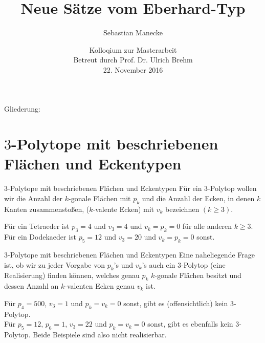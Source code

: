 \documentclass[10pt, notheorems]{beamer}
\begin{document}
\title{Neue Sätze vom {\sc Eberhard}-Typ}
\author{Sebastian Manecke}
\date{Kolloqium zur Masterarbeit\\Betreut durch Prof. Dr. Ulrich Brehm\\22. November 2016}



\frame{\titlepage}



\begin{frame}
  Gliederung:
\tableofcontents
\end{frame}
\section{$3$-Polytope mit beschriebenen Flächen und Eckentypen}
\begin{frame}{$3$-Polytope mit beschriebenen Flächen und Eckentypen}
  Für ein $3$-Polytop wollen wir die Anzahl der $k$-gonale Flächen mit $p_k$ und die Anzahl der Ecken, in denen $k$ Kanten zusammenstoßen, ($k$-valente Ecken) mit $v_k$ bezeichnen $(k \geq 3)$.
  \pause
  \begin{example}
    Für ein Tetraeder ist $p_3 = 4$ und $v_3 = 4$ und $v_k = p_k = 0$ für alle anderen $k \geq 3$.\\
    \pause
    Für ein Dodekaeder ist $p_5 = 12$ und $v_3 = 20$ und $v_k = p_k = 0$ sonst.\\
  \end{example}
\end{frame}
\begin{frame}{$3$-Polytope mit beschriebenen Flächen und Eckentypen}
  Eine naheliegende Frage ist, ob wir zu jeder Vorgabe von $p_k$'s und $v_k$'s auch ein $3$-Polytop (eine Realisierung) finden können, welches genau $p_k$ $k$-gonale Flächen besitzt und dessen Anzahl an $k$-valenten Ecken genau $v_k$ ist.
  \pause
  \begin{example}
    Für $p_4 = 500$, $v_3 = 1$ und $p_k = v_k = 0$ sonst, gibt es (offensichtlich) kein $3$-Polytop.\\
    \pause
    Für $p_5 = 12$, $p_6 = 1$, $v_3 = 22$ und $p_k = v_k = 0$ sonst, gibt es ebenfalls kein $3$-Polytop. Beide Beispiele sind also nicht realisierbar.
  \end{example}
\end{frame}
\end{document}
